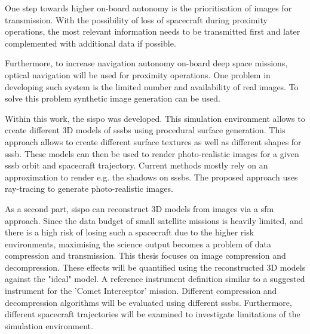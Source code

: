 One step towards higher on-board autonomy is the prioritisation of images for transmission. With the  possibility of loss of spacecraft during proximity operations, the most relevant information needs to be transmitted first and later complemented with additional data if possible.

Furthermore, to increase navigation autonomy on-board deep space missions, optical navigation will be used for proximity operations. One problem in developing such system is the limited number and availability of real images. To solve this problem synthetic image generation can be used.

Within this work, the \gls{sispo} was developed. This simulation environment allows to create different 3D models of \gls{sssb}s using procedural surface generation. This approach allows to create different surface textures as well as different shapes for \gls{sssb}. These models can then be used to render photo-realistic images for a given \gls{sssb} orbit and spacecraft trajectory. Current methods mostly rely on an approximation to render e.g. the shadows on \gls{sssb}s. The proposed approach uses ray-tracing to generate photo-realistic images.

As a second part, \gls{sispo} can reconstruct 3D models from images via a \gls{sfm} approach. Since the data budget of small satellite missions is heavily limited, and there is a high risk of losing such a spacecraft due to the higher risk environments, maximising the science output becomes a problem of data compression and transmission. 
This thesis focuses on image compression and decompression. These effects will be quantified using the reconstructed 3D models against the "ideal" model. A reference instrument definition similar to a suggested instrument for the 'Comet Interceptor' mission. Different compression and decompression algorithms will be evaluated using different \gls{sssb}s. Furthermore, different spacecraft trajectories will be examined to investigate limitations of the simulation environment.